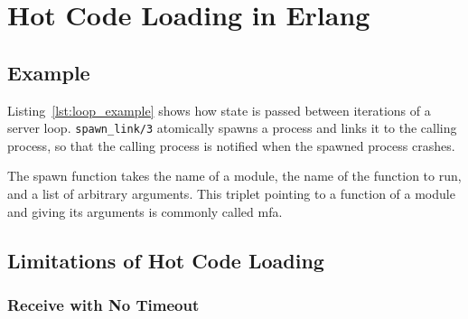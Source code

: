 \chapter{Hot Code Loading in Erlang}

\section{Example}



Listing~\ref{lst:loop_example} shows how state is passed between iterations of a server loop.
\lstinline{spawn_link/3} atomically spawns a process and links it to the calling process, so that the calling process is notified when the spawned process crashes.

The spawn function takes the name of a module, the name of the function to run, and a list of arbitrary arguments. This triplet pointing to a function of a module and giving its arguments is commonly called \acrfull{mfa}.

\section{Limitations of Hot Code Loading}

\subsection{Receive with No Timeout}
